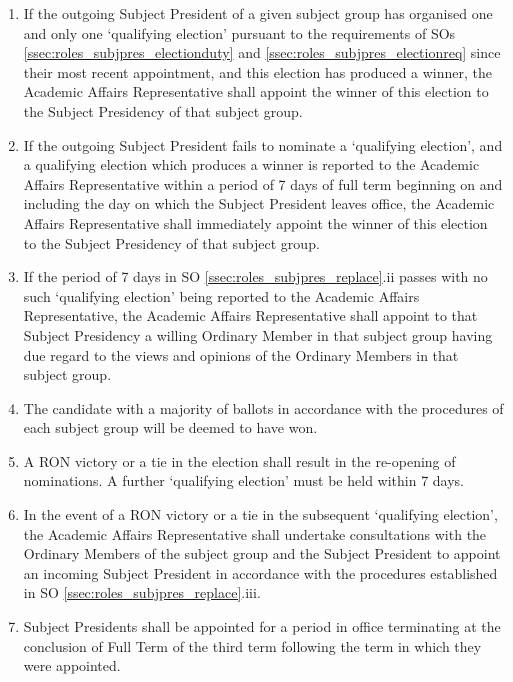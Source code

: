 \begin{enumerate}
    \item If the outgoing Subject President of a given subject group has organised one and only one `qualifying election' pursuant to the requirements of SOs \ref{ssec:roles_subjpres_electionduty} and \ref{ssec:roles_subjpres_electionreq} since their most recent appointment, and this election has produced a winner, the Academic Affairs Representative shall appoint the winner of this election to the Subject Presidency of that subject group.
    \item If the outgoing Subject President fails to nominate a `qualifying election', and a qualifying election which produces a winner is reported to the Academic Affairs Representative within a period of 7 days of full term beginning on and including the day on which the Subject President leaves office, the Academic Affairs Representative shall immediately appoint the winner of this election to the Subject Presidency of that subject group.
    \item If the period of 7 days in SO \ref{ssec:roles_subjpres_replace}.ii passes with no such `qualifying election' being reported to the Academic Affairs Representative, the Academic Affairs Representative shall appoint to that Subject Presidency a willing Ordinary Member in that subject group having due regard to the views and opinions of the Ordinary Members in that subject group.
    \item The candidate with a majority of ballots in accordance with the procedures of each subject group will be deemed to have won.
    \item A RON victory or a tie in the election shall result in the re-opening of nominations. A further `qualifying election' must be held within 7 days.
    \item In the event of a RON victory or a tie in the subsequent `qualifying election', the Academic Affairs Representative shall undertake consultations with the Ordinary Members of the subject group and the Subject President to appoint an incoming Subject President in accordance with the procedures established in SO \ref{ssec:roles_subjpres_replace}.iii.
    \item Subject Presidents shall be appointed for a period in office terminating at the conclusion of Full Term of the third term following the term in which they were appointed.
\end{enumerate}
